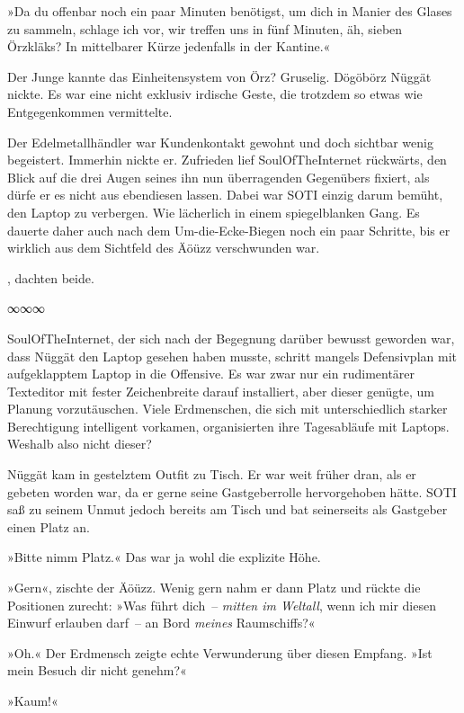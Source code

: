 »Da du offenbar noch ein paar Minuten benötigst, um dich in Manier des Glases zu sammeln, schlage ich vor, wir treffen uns in fünf Minuten, äh, sieben Örzkläks? In mittelbarer Kürze jedenfalls in der Kantine.«

Der Junge kannte das Einheitensystem von Örz? Gruselig. Dögöbörz Nüggät nickte. Es war eine nicht exklusiv irdische Geste, die trotzdem so etwas wie Entgegenkommen vermittelte.

Der Edelmetallhändler war Kundenkontakt gewohnt und doch sichtbar wenig begeistert. Immerhin nickte er. Zufrieden lief SoulOfTheInternet rückwärts, den Blick auf die drei Augen seines ihn nun überragenden Gegenübers fixiert, als dürfe er es nicht aus ebendiesen lassen. Dabei war SOTI einzig darum bemüht, den Laptop zu verbergen. Wie lächerlich in einem spiegelblanken Gang. Es dauerte daher auch nach dem Um-die-Ecke-Biegen noch ein paar Schritte, bis er wirklich aus dem Sichtfeld des Äöüzz verschwunden war.

, dachten beide.

\begin{center}
∞∞∞
\end{center}

SoulOfTheInternet, der sich nach der Begegnung darüber bewusst geworden war, dass Nüggät den Laptop gesehen haben musste, schritt mangels Defensivplan mit aufgeklapptem Laptop in die Offensive. Es war zwar nur ein rudimentärer Texteditor mit fester Zeichenbreite darauf installiert, aber dieser genügte, um Planung vorzutäuschen. Viele Erdmenschen, die sich mit unterschiedlich starker Berechtigung intelligent vorkamen, organisierten ihre Tagesabläufe mit Laptops. Weshalb also nicht dieser?

Nüggät kam in gestelztem Outfit zu Tisch. Er war weit früher dran, als er gebeten worden war, da er gerne seine Gastgeberrolle hervorgehoben hätte. SOTI saß zu seinem Unmut jedoch bereits am Tisch und bat seinerseits als Gastgeber einen Platz an.

»Bitte nimm Platz.« Das war ja wohl die explizite Höhe.

»Gern«, zischte der Äöüzz. Wenig gern nahm er dann Platz und rückte die Positionen zurecht: »Was führt dich~– \emph{mitten im Weltall}, wenn ich mir diesen Einwurf erlauben darf~– an Bord \emph{meines} Raumschiffs?«

»Oh.« Der Erdmensch zeigte echte Verwunderung über diesen Empfang. »Ist mein Besuch dir nicht genehm?«

»Kaum!«

